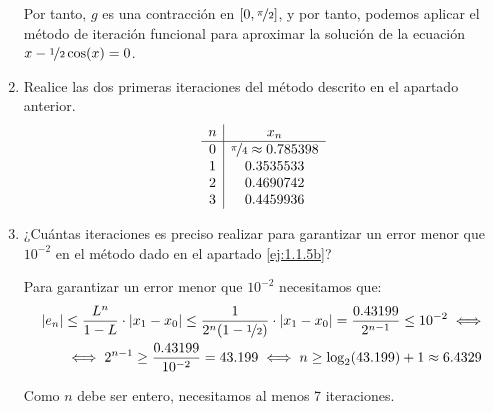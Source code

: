 \begin{ejercicio}
\begin{enumerate}
        Por tanto, $g$ es una contracción en $[0,\nicefrac{\pi}{2}]$, y por tanto, podemos aplicar el método de iteración funcional para aproximar la solución de la ecuación $x-\nicefrac{1}{2}\cos(x)=0$.

        
        \item Realice las dos primeras iteraciones del método descrito en el apartado anterior.
        \begin{equation*}
            \begin{array}{c|c}
                n & x_n\\
                \hline
                0 & \nicefrac{\pi}{4}\approx 0.785398\\
                1 & 0.3535533\\
                2 & 0.4690742\\
                3 & 0.4459936
            \end{array}
        \end{equation*}
        \item ¿Cuántas iteraciones es preciso realizar para garantizar un error menor que $10^{-2}$ en el método dado en el apartado \ref{ej:1.1.5b}?
        
        Para garantizar un error menor que $10^{-2}$ necesitamos que:
        \begin{align*}
            |e_n|&\leq \dfrac{L^n}{1-L}\cdot |x_{1}-x_0|\leq \frac{1}{2^{n}(1-\nicefrac{1}{2})}\cdot |x_1-x_0|=\frac{0.43199}{2^{n-1}}
            \leq 10^{-2}\iff\\&\iff 2^{n-1}\geq \frac{0.43199}{10^{-2}}= 43.199
            \iff n\geq \log_2(43.199)+1\approx 6.4329
        \end{align*}

        Como $n$ debe ser entero, necesitamos al menos 7 iteraciones.
    \end{enumerate}
\end{ejercicio}

